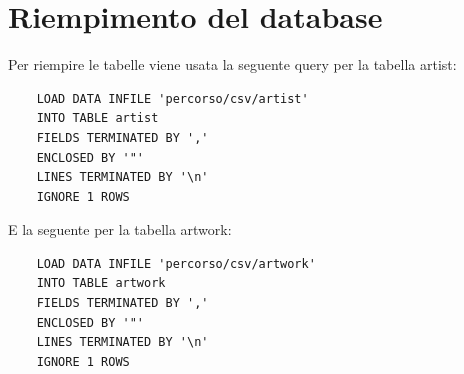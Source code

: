 \documentclass{ol-softwaremanual}
\begin{document}
\newpage
\section{Riempimento del database}
Per riempire le tabelle viene usata la seguente query per la tabella artist:
\begin{verbatim}
    LOAD DATA INFILE 'percorso/csv/artist'
    INTO TABLE artist
    FIELDS TERMINATED BY ','
    ENCLOSED BY '"'
    LINES TERMINATED BY '\n'
    IGNORE 1 ROWS
\end{verbatim}
E la seguente per la tabella artwork:
\begin{verbatim}
    LOAD DATA INFILE 'percorso/csv/artwork'
    INTO TABLE artwork
    FIELDS TERMINATED BY ','
    ENCLOSED BY '"'
    LINES TERMINATED BY '\n'
    IGNORE 1 ROWS
\end{verbatim}
\end{document}
